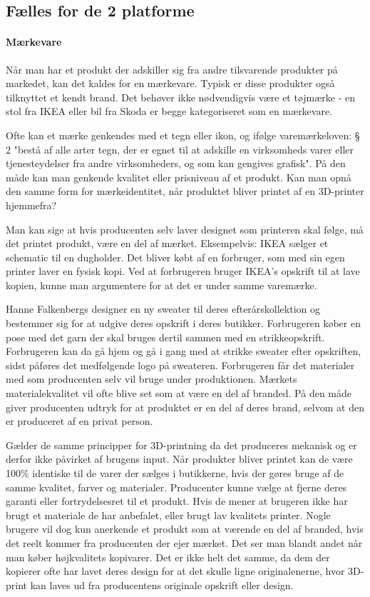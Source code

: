 \subsection{Fælles for de 2 platforme} %


\paragraph{Mærkevare}

Når man har et produkt der adskiller sig fra andre tilsvarende produkter på markedet, kan det kaldes for en mærkevare. Typisk er disse produkter også tilknyttet et kendt brand.
Det behøver ikke nødvendigvis være et tøjmærke - en stol fra IKEA eller bil fra Skoda er begge kategoriseret som en mærkevare. 

Ofte kan et mærke genkendes med et tegn eller ikon, og ifølge varemærkeloven: § 2 "bestå af alle arter tegn, der er egnet til at adskille en virksomheds varer eller tjenesteydelser fra andre virksomheders, og som kan gengives grafisk". \autocite{_varemaerkeloven_2012} På den måde kan man genkende kvalitet eller prisniveau af et produkt. 
Kan man opnå den samme form for mærkeidentitet, når produktet bliver printet af en 3D-printer hjemmefra?

Man kan sige at hvis producenten selv laver designet som printeren skal følge, må det printet produkt, være en del af mærket. Eksempelvis: IKEA sælger et schematic til en dugholder. Det bliver købt af en forbruger, som med sin egen printer laver en fysisk kopi. Ved at forbrugeren bruger IKEA’s opskrift til at lave kopien, kunne man argumentere for at det er under samme varemærke. 

Hanne Falkenbergs \autocite{hanne_falkenberg_hanne_????} designer en ny sweater til deres efterårskollektion og bestemmer sig for at udgive deres opskrift i deres butikker. Forbrugeren køber en pose med det garn der skal bruges dertil sammen med en strikkeopskrift. Forbrugeren kan da gå hjem og gå i gang med at strikke sweater efter opskriften, sidst påføres det medfølgende logo på sweateren. Forbrugeren får det materialer med som producenten selv vil bruge under produktionen. Mærkets materialekvalitet vil ofte blive set som at være en del af branded.  På den måde giver producenten udtryk for at produktet er en del af deres brand, selvom at den er produceret af en privat person. 
																
Gælder de samme principper for 3D-printning da det produceres mekanisk og er derfor ikke påvirket af brugens input. Når produkter bliver printet kan de være 100\% identiske til de varer der sælges i butikkerne, hvis der gøres bruge af de samme kvalitet, farver og materialer.
Producenter kunne vælge at fjerne deres garanti eller fortrydelsesret til et produkt. Hvis de mener at brugeren ikke har brugt et materiale de har anbefalet, eller brugt lav kvalitets printer.
Nogle brugere vil dog kun anerkende et produkt som at værende en del af branded, hvis det reelt kommer fra producenten der ejer mærket. Det ser man blandt andet når man køber højkvalitets kopivarer.\autocite{_vi_????}
Det er ikke helt det samme, da dem der kopierer ofte har lavet deres design for at det skulle ligne originalenerne, hvor 3D-print kan laves ud fra producentens originale opskrift eller design.

